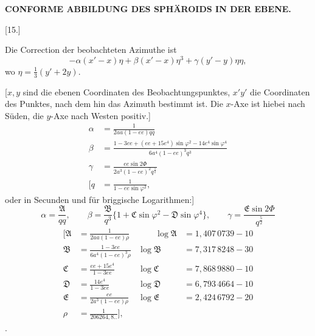 \par\clearpage
\noindent\null\hfill{\small\textbf{CONFORME ABBILDUNG DES SPHÄROIDS IN DER EBENE.}}\hfill{}\par\medskip

\begin{center}
[15.]\par{}
\end{center}
Die Correction der beobachteten Azimuthe ist
\[
-\alpha(x'-x)\eta+\beta(x'-x)\eta^3+\gamma(y'-y)\eta\eta,
\]
\noindent wo \(\eta=\tfrac13(y'+2y)\).

[\(x,y\) sind die ebenen Coordinaten des Beobachtungspunktes, \(x'y'\) die
Coordinaten des Punktes, nach dem hin das Azimuth bestimmt ist. Die \(x\)-Axe ist
hiebei nach Süden, die \(y\)-Axe nach Westen positiv.]
\[
\begin{aligned}
\alpha&=\frac1{2aa(1-ee)qq}\\
\beta&=\frac{1-3ee+(ee+15e^4)\sin\varphi^2-14e^4\sin\varphi^4}{6a^4(1-ee)^3q^3}\\
\gamma&=\frac{ee\sin2\Phi}{2a^3(1-ee)^2q^{\frac52}}\\
\mathopen{[}q&=\frac1{1-ee\sin\varphi^2},
\end{aligned}
\]
\noindent oder in Secunden und für briggische Logarithmen:]
\[
\alpha=\frac{\mathfrak A}{qq},\qquad
\beta=\frac{\mathfrak B}{q^3}\{1+\mathfrak C\sin\varphi^2-\mathfrak D\sin\varphi^4\},\qquad
\gamma=\frac{\mathfrak E\sin2\Phi}{q^{\frac52}}
\]
\[
\begin{alignedat}{2}
{[}\mathfrak A&=\frac1{2aa(1-ee)\rho}
 &\qquad \log\mathfrak A&=1{,}407\,0739-10\\
\mathfrak B&=\frac{1-3ee}{6a^4(1-ee)^3\rho}
 &\log\mathfrak B&=7{,}317\,8248-30\\
\mathfrak C&=\frac{ee+15e^4}{1-3ee}
 &\log\mathfrak C&=7{,}868\,9880-10\\
\mathfrak D&=\frac{14e^4}{1-3ee}
 &\log\mathfrak D&=6{,}793\,4664-10\\
\mathfrak E&=\frac{ee}{2a^3(1-ee)\rho}
 &\log\mathfrak E&=2{,}424\,6792-20\\
\rho&=\frac1{206264{,}8..}\mathclose{]},
\end{alignedat}
\]
\noindent [wobei der Abplattungswerth \(\dfrac1{302{,}68}\) benutzt worden ist.
\(\alpha,\beta,\gamma\) gehören zum Argument
\(\tfrac13(x'+2x)=x+\tfrac13(x'-x)\)].

